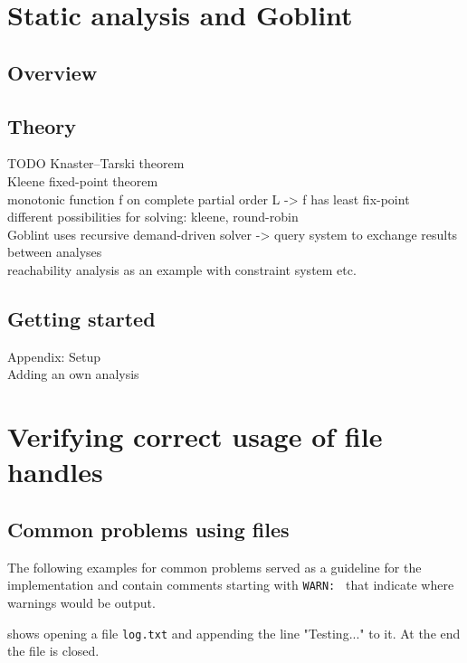 


\chapter{Static analysis and Goblint}
\section{Overview}

\section{Theory} %
TODO
Knaster–Tarski theorem\\
Kleene fixed-point theorem\\
monotonic function f on complete partial order L -> f has least fix-point\\
different possibilities for solving: kleene, round-robin\\
Goblint uses recursive demand-driven solver -> query system to exchange results between analyses\\
reachability analysis as an example with constraint system etc.\\

\section{Getting started}
Appendix: Setup\\
Adding an own analysis


\chapter{Verifying correct usage of file handles}
\section{Common problems using files}
The following examples for common problems served as a guideline for the implementation and contain comments starting with \verb|WARN: | that indicate where warnings would be output.

 shows opening a file \verb|log.txt| and appending the line "Testing..." to it. At the end the file is closed.

